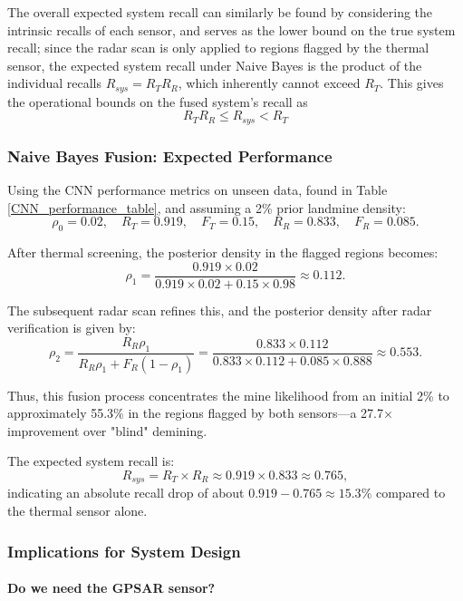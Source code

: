         The overall expected system recall can similarly be found by considering the intrinsic recalls of each sensor, and serves as the lower bound on the true system recall; since the radar scan is only applied to regions flagged by the thermal sensor, the expected system recall under Naive Bayes is the product of the individual recalls \(R_{sys} = R_T R_R\), 
        which inherently cannot exceed $R_T$. This gives the operational bounds on the fused system's recall as
        \[
        R_TR_R\leq R_{sys}< R_T
        \]
    
    \subsubsection{Naive Bayes Fusion: Expected Performance}
    
        Using the CNN performance metrics on unseen data, found in Table \ref{CNN_performance_table}, and assuming a 2\% prior landmine density:
        \[
        \rho_0 = 0.02,\quad R_T = 0.919,\quad F_T = 0.15,\quad R_R = 0.833,\quad F_R = 0.085.
        \]
        
        After thermal screening, the posterior density in the flagged regions becomes:
        \[
        \rho_1 = \frac{0.919 \times 0.02}{0.919 \times 0.02 + 0.15 \times 0.98} \approx 0.112.
        \]
        
        The subsequent radar scan refines this, and the posterior density after radar verification is given by:
        \[
        \rho_2 = \frac{R_R \rho_1}{R_R \rho_1 + F_R (1-\rho_1)} = \frac{0.833 \times 0.112}{0.833 \times 0.112 + 0.085 \times 0.888} \approx 0.553.
        \]
        
        Thus, this fusion process concentrates the mine likelihood from an initial 2\% to approximately 55.3\% in the regions flagged by both sensors—a  27.7× improvement over "blind" demining.
        
        The expected system recall is:
        \[
        R_{sys} = R_T \times R_R \approx 0.919 \times 0.833 \approx 0.765,
        \]
        indicating an absolute recall drop of about $0.919 - 0.765 \approx 15.3\%$ compared to the thermal sensor alone.


    \subsubsection{Implications for System Design}

        \paragraph{Do we need the GPSAR sensor?}
        
